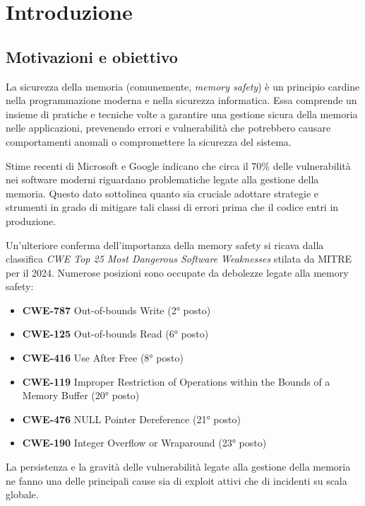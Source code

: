 \chapter{Introduzione}
\label{cha:introduction_new}

\section*{Motivazioni e obiettivo}
\label{sec:motivation}
La sicurezza della memoria (comunemente, \textit{memory safety}) è un principio
cardine nella programmazione moderna e nella sicurezza informatica. Essa comprende
un insieme di pratiche e tecniche volte a garantire una gestione sicura della memoria
nelle applicazioni, prevenendo errori e vulnerabilità che potrebbero causare
comportamenti anomali o compromettere la sicurezza del sistema.

Stime recenti di Microsoft\cite{microsoft_proactive_approach} e Google\cite{chromium_memory_safety}
indicano che circa il 70\% delle vulnerabilità nei software moderni riguardano problematiche
legate alla gestione della memoria. Questo dato sottolinea quanto sia cruciale
adottare strategie e strumenti in grado di mitigare tali classi di errori prima
che il codice entri in produzione.

Un'ulteriore conferma dell'importanza della memory safety si ricava dalla
classifica \textit{CWE Top 25 Most Dangerous Software Weaknesses}\cite{cwe_top25_2024}
stilata da MITRE per il 2024. Numerose posizioni sono occupate da debolezze
legate alla memory safety:
\begin{itemize}
  \item \textbf{CWE-787} Out-of-bounds Write (2° posto)

  \item \textbf{CWE-125} Out-of-bounds Read (6° posto)

  \item \textbf{CWE-416} Use After Free (8° posto)

  \item \textbf{CWE-119} Improper Restriction of Operations within the Bounds of
    a Memory Buffer (20° posto)

  \item \textbf{CWE-476} NULL Pointer Dereference (21° posto)

  \item \textbf{CWE-190} Integer Overflow or Wraparound (23° posto)
\end{itemize}
La persistenza e la gravità delle vulnerabilità legate alla gestione della memoria
ne fanno una delle principali cause sia di exploit attivi che di incidenti su scala
globale.

